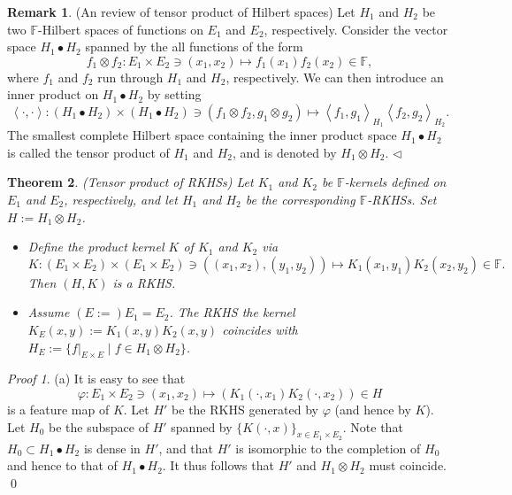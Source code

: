 \documentclass[a4paper,12pt]{article}
\newtheorem{thm}{Theorem}[section]
\theoremstyle{remark}
\newtheorem*{prf}{Proof}
\theoremstyle{definition}
\newtheorem{rem}[thm]{Remark}
\theoremstyle{definition}
\theoremstyle{definition}
\newcommand{\ip}[2]{\left<#1, #2 \right>}
\newcommand{\fin}{\hfill \( \triangleleft \) }
\begin{document}
\begin{rem} (An review of tensor product of Hilbert spaces)
	Let \( H_1 \) and \( H_2 \) be two \( \mathbb{F} \)-Hilbert spaces of functions on \( E_1 \) and \( E_2 \), respectively. Consider the vector space \( H_1 \bullet H_2 \) spanned by the all functions of the form
	\begin{equation*}
		f_1 \otimes f_2: E_1 \times E_2 \ni (x_1,x_2) \mapsto f_1(x_1)f_2(x_2) \in \mathbb{F},
	\end{equation*}
	where \( f_1 \) and \( f_2 \) run through \( H_1 \) and \( H_2 \), respectively.
	We can then introduce an inner product on \( H_1 \bullet H_2 \) by setting
	\begin{equation*}
		\ip{\cdot }{\cdot } : \left( H_1 \bullet H_2 \right) \times \left( H_1 \bullet H_2 \right) \ni (f_1 \otimes f_2, g_1 \otimes  g_2) \mapsto \ip{f_1}{g_1}_{H_1} \ip{f_2}{g_2}_{H_2}.
	\end{equation*}
	The smallest complete Hilbert space containing the inner product space \( H_1 \bullet H_2 \) is called the tensor product of \( H_1 \) and \( H_2 \), and is denoted by \( H_1 \otimes H_2 \).
	\fin\end{rem}
\begin{thm} (Tensor product of RKHSs)
	Let \( K_1 \) and \( K_2 \) be \( \mathbb{F} \)-kernels defined on \( E_1 \) and \( E_2 \), respectively, and let \( H_1 \) and \( H_2 \) be the corresponding \( \mathbb{F} \)-RKHSs. Set \( H:=H_1 \otimes H_2 \).
	\begin{itemize}
		\item[(a)] Define the product kernel \( K \) of \( K_1 \) and \( K_2 \) via
		      \begin{equation*}
			      K:(E_1 \times E_2) \times (E_1 \times E_2) \ni \left( (x_1, x_2), (y_1,y_2) \right) \mapsto K_1(x_1,y_1)K_2(x_2,y_2) \in \mathbb{F}.
		      \end{equation*}
		      Then \( (H,K) \) is a RKHS.
		\item[(b)] Assume \( (E:=) E_1 = E_2 \). The RKHS the kernel \( K_E(x,y) :=K_1(x,y)K_2(x,y) \) coincides with \( H_E:=\{f|_{E \times E} \mid f \in H_1 \otimes H_2\} \).
	\end{itemize}
\end{thm}
\begin{prf}
	(a) It is easy to see that
	\begin{equation*}
		\varphi:E_1 \times E_2 \ni (x_1,x_2) \mapsto \left( K_1(\cdot ,x_1)K_2(\cdot ,x_2) \right)\in H
	\end{equation*}
	is a feature map of \( K \). Let \( H' \) be the RKHS generated by \( \varphi \) (and hence by \( K \)). Let \( H_0 \) be the subspace of \( H' \) spanned by \( \{K(\cdot ,x)\}_{x \in E_1 \times E_2} \).
	Note that \( H_0 \subset H_1 \bullet H_2\) is dense in \( H' \), and that \( H' \) is isomorphic to the completion of \( H_0 \) and hence to that of \( H_1 \bullet H_2 \). It thus follows that \( H' \) and \( H_1 \otimes H_2 \) must coincide.
	\qed\end{prf}
\end{document}
